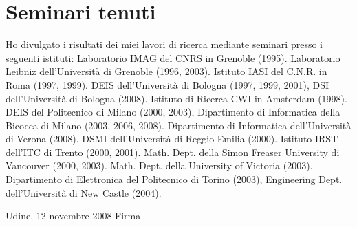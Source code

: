 \documentclass[11pt]{article}
\begin{document}
\section{Seminari tenuti}

Ho divulgato
i risultati dei miei lavori di ricerca mediante
seminari presso i seguenti istituti:
Laboratorio IMAG del CNRS in Grenoble (1995).
Laboratorio Leibniz dell'Universit\`a di Grenoble (1996, 2003).
Istituto IASI del C.N.R. in Roma (1997, 1999).
DEIS dell'Universit\`a di Bologna (1997, 1999, 2001),
DSI dell'Universit\`a di Bologna (2008).
Istituto di Ricerca CWI in Amsterdam (1998).
DEIS del Politecnico di Milano (2000, 2003),
Dipartimento di Informatica della Bicocca di Milano (2003, 2006, 2008).
Dipartimento di Informatica dell'Universit\`a di Verona (2008).
DSMI dell'Universit\`a di Reggio Emilia (2000).
Istituto IRST dell'ITC di Trento (2000, 2001).
Math. Dept. della Simon Freaser University di Vancouver (2000, 2003).
Math. Dept. della University of Victoria (2003).
Dipartimento di Elettronica del Politecnico di Torino (2003),
Engineering Dept. dell'Universit\`a di New Castle (2004).\\


\vspace{1.4cm}
               

Udine, 12 novembre 2008 \hspace{5.4cm} Firma
\end{document}

